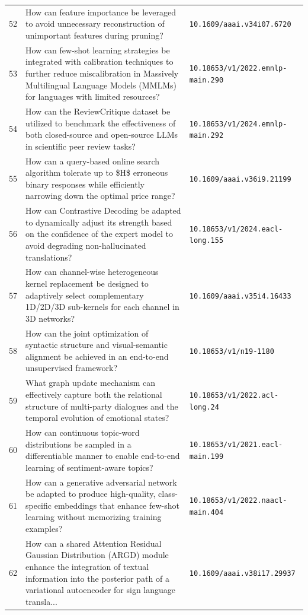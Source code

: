 \documentclass[runningheads]{llncs}
\begin{document}
\begin{longtable}{@{}p{0.5cm}p{7.2cm}p{2.5cm}@{}}
52 & How can feature importance be leveraged to avoid unnecessary reconstruction of unimportant features during pruning? & \texttt{10.1609/aaai.v34i07.6720} \\
53 & How can few-shot learning strategies be integrated with calibration techniques to further reduce miscalibration in Massively Multilingual Language Models (MMLMs) for languages with limited resources? & \texttt{10.18653/v1/2022.emnlp-main.290} \\
54 & How can the ReviewCritique dataset be utilized to benchmark the effectiveness of both closed-source and open-source LLMs in scientific peer review tasks? & \texttt{10.18653/v1/2024.emnlp-main.292} \\
55 & How can a query-based online search algorithm tolerate up to \$H\$ erroneous binary responses while efficiently narrowing down the optimal price range? & \texttt{10.1609/aaai.v36i9.21199} \\
56 & How can Contrastive Decoding be adapted to dynamically adjust its strength based on the confidence of the expert model to avoid degrading non-hallucinated translations? & \texttt{10.18653/v1/2024.eacl-long.155} \\
57 & How can channel-wise heterogeneous kernel replacement be designed to adaptively select complementary 1D/2D/3D sub-kernels for each channel in 3D networks? & \texttt{10.1609/aaai.v35i4.16433} \\
58 & How can the joint optimization of syntactic structure and visual-semantic alignment be achieved in an end-to-end unsupervised framework? & \texttt{10.18653/v1/n19-1180} \\
59 & What graph update mechanism can effectively capture both the relational structure of multi-party dialogues and the temporal evolution of emotional states? & \texttt{10.18653/v1/2022.acl-long.24} \\
60 & How can continuous topic-word distributions be sampled in a differentiable manner to enable end-to-end learning of sentiment-aware topics? & \texttt{10.18653/v1/2021.eacl-main.199} \\
61 & How can a generative adversarial network be adapted to produce high-quality, class-specific embeddings that enhance few-shot learning without memorizing training examples? & \texttt{10.18653/v1/2022.naacl-main.404} \\
62 & How can a shared Attention Residual Gaussian Distribution (ARGD) module enhance the integration of textual information into the posterior path of a variational autoencoder for sign language transla... & \texttt{10.1609/aaai.v38i17.29937} \\

\end{longtable}
\end{document}
